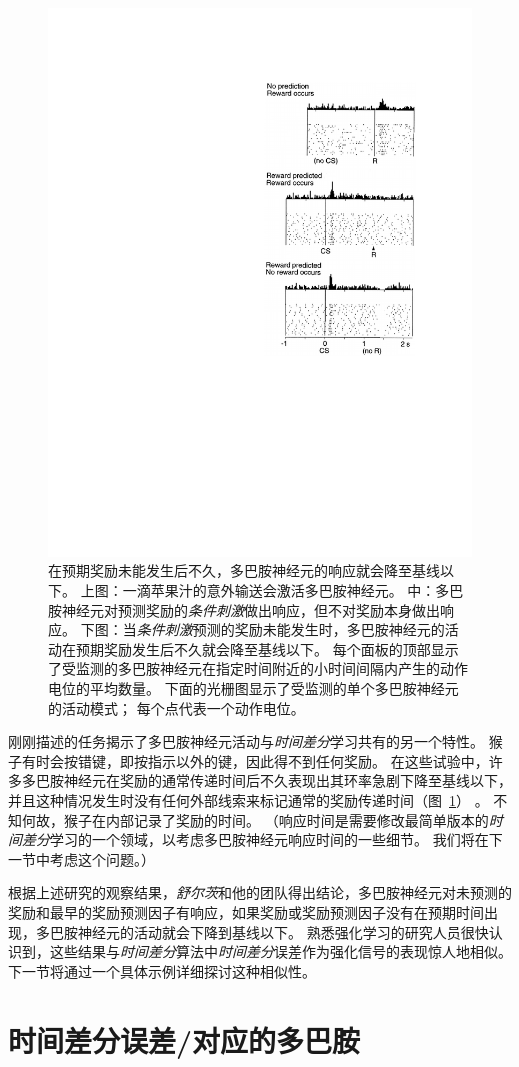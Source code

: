 \begin{figure}[!htb]
	\centering
	\includegraphics[width=0.45\linewidth]{chap12/fig_12_4}
	\caption{在预期奖励未能发生后不久，多巴胺神经元的响应就会降至基线以下。
		上图：一滴苹果汁的意外输送会激活多巴胺神经元。
		中：多巴胺神经元对预测奖励的\textit{条件刺激}做出响应，但不对奖励本身做出响应。
		下图：当\textit{条件刺激}预测的奖励未能发生时，多巴胺神经元的活动在预期奖励发生后不久就会降至基线以下。
		每个面板的顶部显示了受监测的多巴胺神经元在指定时间附近的小时间间隔内产生的动作电位的平均数量。
		下面的光栅图显示了受监测的单个多巴胺神经元的活动模式；
		每个点代表一个动作电位\cite{schultz1997neural}。
		\label{fig:12_4}}
\end{figure}


刚刚描述的任务揭示了多巴胺神经元活动与\textit{时间差分}学习共有的另一个特性。
猴子有时会按错键，即按指示以外的键，因此得不到任何奖励。
在这些试验中，许多多巴胺神经元在奖励的通常传递时间后不久表现出其环率急剧下降至基线以下，并且这种情况发生时没有任何外部线索来标记通常的奖励传递时间（图~\ref{fig:12_4}） 。
不知何故，猴子在内部记录了奖励的时间。
（响应时间是需要修改最简单版本的\textit{时间差分}学习的一个领域，以考虑多巴胺神经元响应时间的一些细节。
我们将在下一节中考虑这个问题。）


根据上述研究的观察结果，\textit{舒尔茨}和他的团队得出结论，多巴胺神经元对未预测的奖励和最早的奖励预测因子有响应，如果奖励或奖励预测因子没有在预期时间出现，多巴胺神经元的活动就会下降到基线以下。
熟悉强化学习的研究人员很快认识到，这些结果与\textit{时间差分}算法中\textit{时间差分}误差作为强化信号的表现惊人地相似。
下一节将通过一个具体示例详细探讨这种相似性。


\section{时间差分误差/对应的多巴胺} \label{sec:td_dopamine}

